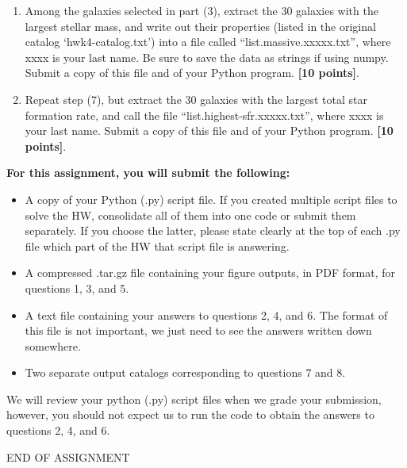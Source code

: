 \documentclass[11pt]{article}    %
\begin{document}
\begin{enumerate}
\vspace{1mm}
\item
\noindent
Among the galaxies selected in part (3), extract the 30 galaxies with
the largest stellar mass, and write out their properties (listed in  the 
original catalog  `hwk4-catalog.txt')  into a file called 
``list.massive.xxxxx.txt'', where xxxx is your last name. Be
sure to save the data as strings if using numpy.
Submit a copy of this file and of your Python program.
{\bf [10 points]}.


\vspace{1mm}
\item
\noindent
Repeat step (7), but extract the  30 galaxies with the largest 
total star formation rate, and call the file ``list.highest-sfr.xxxxx.txt'', 
where xxxx is your last name.
Submit a copy of this file and of your Python program.
{\bf [10 points]}.

\end{enumerate}

\vspace{2mm}

\noindent
{\textbf{For this assignment, you will submit the following:}}
\begin{itemize}
	\item A copy of your Python (.py) script file. If you created multiple script files to solve the HW,
		consolidate all of them into one code or submit them separately. If you choose the latter, please
		state clearly at the top of each .py file which part of the HW that script file is answering.
	\item A compressed .tar.gz file containing your figure outputs, in PDF format, for questions 1, 3, and 5.
	\item A text file containing your answers to questions 2, 4, and 6. The format of this file is not important, 
		we just need to see the answers written down somewhere.
	\item Two separate output catalogs corresponding to questions 7 and 8.
\end{itemize}

\noindent
We will review your python (.py) script files when we grade your submission, however, you should not expect us to run the code to obtain the answers to questions 2, 4, and 6.

\begin{center}
END OF ASSIGNMENT
\end{center}
\end{document}
